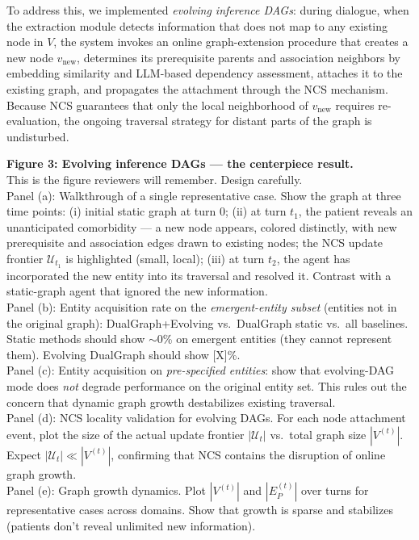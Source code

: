 \documentclass[11pt,a4paper]{article}
\newcommand{\placeholder}[1]{%
  \begin{tcolorbox}[colback=yellow!10,colframe=orange!60!black,
    fonttitle=\bfseries,title=Placeholder]
    #1
  \end{tcolorbox}%
}
\begin{document}
To address this, we implemented \emph{evolving inference DAGs}: during
dialogue, when the extraction module detects information that does not map
to any existing node in $V$, the system invokes an online graph-extension
procedure that creates a new node $v_{\mathrm{new}}$, determines its
prerequisite parents and association neighbors by embedding similarity and
LLM-based dependency assessment, attaches it to the existing graph, and
propagates the attachment through the NCS mechanism. Because NCS guarantees
that only the local neighborhood of $v_{\mathrm{new}}$ requires
re-evaluation, the ongoing traversal strategy for distant parts of the graph
is undisturbed.

\placeholder{%
  \textbf{Figure 3: Evolving inference DAGs --- the centerpiece result.}\\
  This is the figure reviewers will remember. Design carefully.\\[0.5em]
  Panel (a): Walkthrough of a single representative case. Show the graph
  at three time points: (i) initial static graph at turn 0; (ii) at turn
  $t_1$, the patient reveals an unanticipated comorbidity --- a new node
  appears, colored distinctly, with new prerequisite and association edges
  drawn to existing nodes; the NCS update frontier $\mathcal{U}_{t_1}$ is
  highlighted (small, local); (iii) at turn $t_2$, the agent has
  incorporated the new entity into its traversal and resolved it. Contrast
  with a static-graph agent that ignored the new information.\\
  Panel (b): Entity acquisition rate on the \emph{emergent-entity subset}
  (entities not in the original graph): DualGraph+Evolving vs.\ DualGraph
  static vs.\ all baselines. Static methods should show $\sim$0\% on
  emergent entities (they cannot represent them). Evolving DualGraph should
  show [X]\%.\\
  Panel (c): Entity acquisition on \emph{pre-specified entities}: show that
  evolving-DAG mode does \emph{not} degrade performance on the original
  entity set. This rules out the concern that dynamic graph growth
  destabilizes existing traversal.\\
  Panel (d): NCS locality validation for evolving DAGs. For each node
  attachment event, plot the size of the actual update frontier
  $|\mathcal{U}_t|$ vs.\ total graph size $|V^{(t)}|$. Expect
  $|\mathcal{U}_t| \ll |V^{(t)}|$, confirming that NCS contains the
  disruption of online graph growth.\\
  Panel (e): Graph growth dynamics. Plot $|V^{(t)}|$ and $|E_P^{(t)}|$
  over turns for representative cases across domains. Show that growth
  is sparse and stabilizes (patients don't reveal unlimited new
  information).
}
\end{document}
